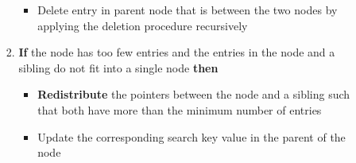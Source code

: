 \begin{itemize}[label=\(\rhd\)]
\begin{itemize}[label=\(\rhd\)]
\begin{enumerate}
\begin{itemize}[label=\(\rhd\)]
                \item[] Delete entry in parent node that is between the two nodes by applying the deletion procedure recursively
            \end{itemize}
            \item \textbf{If} the node has too few entries and the entries in the node and a sibling do not fit into a single node \textbf{then} 
            \begin{itemize}[label=\(\rhd\)]
                \item[] \textbf{Redistribute} the pointers between the node and a sibling such that both have more than the minimum number of entries
                \item[] Update the corresponding search key value in the parent of the node
            \end{itemize}
        \end{enumerate}
    \end{itemize}
\end{itemize}

